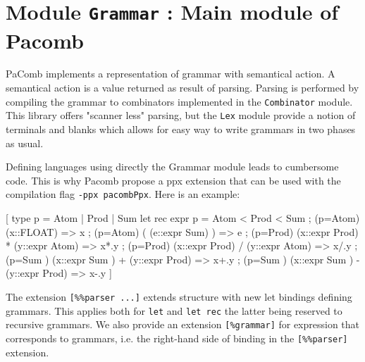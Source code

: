 \documentclass[11pt]{article}
\begin{document}
\tableofcontents
\section{Module {\tt{Grammar}} : Main module of Pacomb}
\label{module:Grammar}



    PaComb implements a representation  of grammar with semantical action.  A
    semantical action  is a value returned  as result of parsing.  Parsing is
    performed  by compiling  the grammar  to combinators  implemented in  the
    {\tt{Combinator}} module. This library offers  "scanner less" parsing, but the
    {\tt{Lex}} module  provide a notion of  terminals and blanks which  allows for
    easy way to write grammars in two phases as usual.


    Defining languages using directly the  Grammar module leads to cumbersome
    code. This is  why Pacomb propose a  ppx extension that can  be used with
    the compilation flag {\tt{-ppx pacombPpx}}. Here is an example:


    \begin{ocamldoccode}

    [%
       type p = Atom | Prod | Sum
       let rec
         expr p = Atom < Prod < Sum
                ; (p=Atom) (x::FLOAT)                        => x
                ; (p=Atom) {\textquotesingle}({\textquotesingle} (e::expr Sum) {\textquotesingle}){\textquotesingle}             => e
                ; (p=Prod) (x::expr Prod) {\textquotesingle}*{\textquotesingle} (y::expr Atom) => x*.y
                ; (p=Prod) (x::expr Prod) {\textquotesingle}/{\textquotesingle} (y::expr Atom) => x/.y
                ; (p=Sum ) (x::expr Sum ) {\textquotesingle}+{\textquotesingle} (y::expr Prod) => x+.y
                ; (p=Sum ) (x::expr Sum ) {\textquotesingle}-{\textquotesingle} (y::expr Prod) => x-.y
    ]
\end{ocamldoccode}



    The extension  {\tt{[\%\%parser ...]}} extends  structure with new  let bindings
    defining grammars. This  applies both for {\tt{let}} and {\tt{let  rec}} the latter
    being  reserved  to recursive  grammars.  We  also provide  an  extension
    {\tt{[\%grammar]}}  for  expression  that  corresponds to  grammars,  i.e.  the
    right-hand side of binding in the {\tt{[\%\%parser]}} extension.
\end{document}
